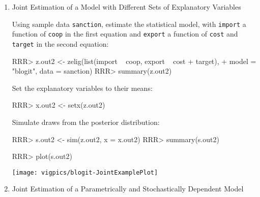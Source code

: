 \begin{enumerate}
\item {Joint Estimation of a Model with Different Sets of Explanatory Variables}\label{sto.dep.logit}

Using sample data \texttt{sanction}, estimate the statistical model, 
with {\tt import} a function of {\tt coop} in the first equation and {\tt export} a 
function of {\tt cost} and {\tt target} in the second equation:
\begin{Schunk}
\begin{Sinput}
RRR>  z.out2 <- zelig(list(import ~ coop, export ~ cost + target), 
+                   model = "blogit", data = sanction)
RRR>  summary(z.out2)
\end{Sinput}
\end{Schunk}
Set the explanatory variables to their means:
\begin{Schunk}
\begin{Sinput}
RRR>  x.out2 <- setx(z.out2)
\end{Sinput}
\end{Schunk}
Simulate draws from the posterior distribution:
\begin{Schunk}
\begin{Sinput}
RRR>  s.out2 <- sim(z.out2, x = x.out2)
RRR>  summary(s.out2)
\end{Sinput}
\end{Schunk}
\begin{center}
\begin{Schunk}
\begin{Sinput}
RRR>  plot(s.out2)
\end{Sinput}
\end{Schunk}
\texttt{[image: vigpics/blogit-JointExamplePlot]}
\end{center}

\item Joint Estimation of a Parametrically and Stochastically
Dependent Model 
\label{pdep.l}
  

\end{enumerate}
